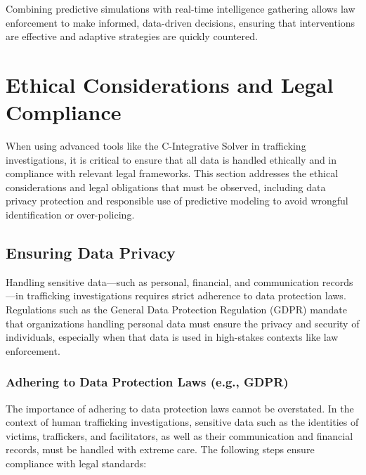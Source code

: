 \documentclass[%
 preprint, linenumbers,
 amsmath,amssymb,
 aps, physrev,
]{revtex4-2}
\begin{document}
Combining predictive simulations with real-time intelligence gathering allows law enforcement to make informed, data-driven decisions, ensuring that interventions are effective and adaptive strategies are quickly countered.

\section{Ethical Considerations and Legal Compliance}

When using advanced tools like the C-Integrative Solver in trafficking investigations, it is critical to ensure that all data is handled ethically and in compliance with relevant legal frameworks. This section addresses the ethical considerations and legal obligations that must be observed, including data privacy protection and responsible use of predictive modeling to avoid wrongful identification or over-policing.

\subsection{Ensuring Data Privacy}

Handling sensitive data—such as personal, financial, and communication records—in trafficking investigations requires strict adherence to data protection laws. Regulations such as the General Data Protection Regulation (GDPR) mandate that organizations handling personal data must ensure the privacy and security of individuals, especially when that data is used in high-stakes contexts like law enforcement.

\subsubsection{Adhering to Data Protection Laws (e.g., GDPR)}

The importance of adhering to data protection laws cannot be overstated. In the context of human trafficking investigations, sensitive data such as the identities of victims, traffickers, and facilitators, as well as their communication and financial records, must be handled with extreme care. The following steps ensure compliance with legal standards:
\end{document}
